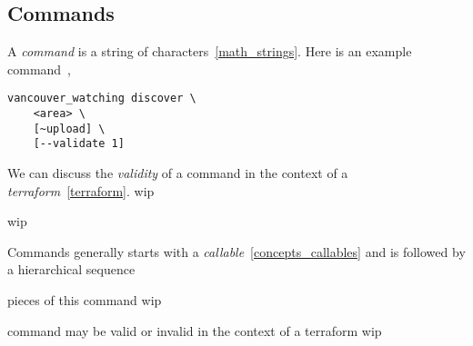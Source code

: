 \subsection{Commands}
\label{commands}

A \emph{command} is a string of characters~\ref{math_strings}. Here is an example command~\cite{vanwatch},

\begin{verbatim}
vancouver_watching discover \
    <area> \
    [~upload] \
    [--validate 1]
\end{verbatim}

We can discuss the \emph{validity} of a command in the context of a \emph{terraform}~\ref{terraform}. wip

wip

Commands generally starts with a \emph{callable}~\ref{concepts_callables} and is followed by a hierarchical sequence 

pieces of this command wip

command may be valid or invalid in the context of a terraform wip